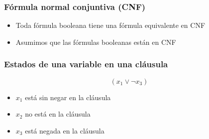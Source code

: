 \documentclass{beamer}
\begin{document}
\begin{frame}
    \frametitle{Fórmula normal conjuntiva (CNF)}
    
    \begin{itemize}
        \item Toda fórmula booleana tiene una fórmula equivalente en CNF
              \pause
        \item Asumimos que las fórmulas booleanas están en CNF
    \end{itemize}
    
\end{frame}

\begin{frame}

    \frametitle{Estados de una variable en una cláusula}
    
    \begin{Large}    
        $$(x_1\vee  \neg x_3)$$
    \end{Large}
    
    \pause
    \vspace{1cm}
    \begin{itemize}
        \item<1-> $x_1$ está sin negar en la cláusula
        \item<3-> $x_2$ no está en la cláusula
        \item<2-> $x_3$ está negada en la cláusula
    \end{itemize}
\end{frame}
\end{document}
